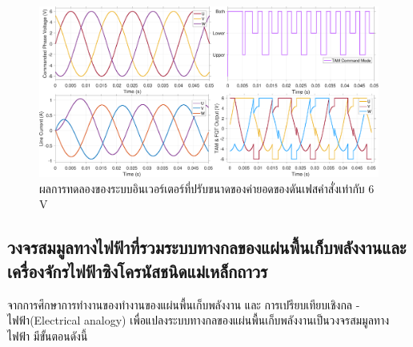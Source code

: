 \documentclass[11pt,a4paper]{article}
\begin{document}
\begin{figure}[H]
    \centering
    \includegraphics[width=\textwidth]{6V.pdf}
    \caption{ผลการทดลองของระบบอินเวอร์เตอร์ที่ปรับขนาดของค่ายอดของดันเฟสคำสั่งเท่ากับ 6 V}
    \label{6V}
\end{figure}





\subsection{วงจรสมมูลทางไฟฟ้าที่รวมระบบทางกลของแผ่นพื้นเก็บพลังงานและเครื่องจักรไฟฟ้าซิงโครนัสชนิดแม่เหล็กถาวร}
จากการศึกษาการทำงานของทำงานของแผ่นพื้นเก็บพลังงาน และ การเปรียบเทียบเชิงกล - ไฟฟ้า(Electrical analogy) เพื่อแปลงระบบทางกลของแผ่นพื้นเก็บพลังงานเป็นวงจรสมมูลทางไฟฟ้า มีขั้นตอนดังนี้
\end{document}
